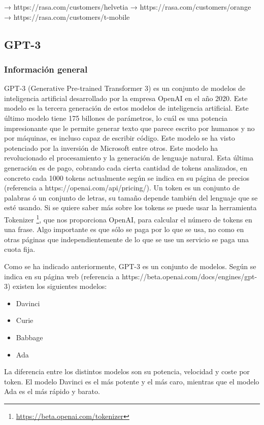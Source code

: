 → https://rasa.com/customers/helvetia
→ https://rasa.com/customers/orange
→ https://rasa.com/customers/t-mobile


\subsection{GPT-3}

\subsubsection*{Información general}

GPT-3 (Generative Pre-trained Transformer 3) es un conjunto de modelos de inteligencia artificial desarrollado por la empresa OpenAI en el año 2020. Este modelo es la tercera generación de estos modelos de inteligencia artificial. Este último modelo tiene 175 billones de parámetros, lo cuál es una potencia impresionante que le permite generar texto que parece escrito por humanos y no por máquinas, es incluso capaz de escribir código. Este modelo se ha visto potenciado por la inversión de Microsoft entre otros. Este modelo ha revolucionado el procesamiento y la generación de lenguaje natural. Esta última generación es de pago, cobrando cada cierta cantidad de tokens analizados, en concreto cada 1000 tokens actualmente según se indica en su página de precios (referencia a https://openai.com/api/pricing/). Un token es un conjunto de palabras ó un conjunto de letras, su tamaño depende también del lenguaje que se esté usando. Si se quiere saber más sobre los tokens se puede usar la herramienta Tokenizer \footnote{\url{https://beta.openai.com/tokenizer}}, que nos proporciona OpenAI, para calcular el número de tokens en una frase. Algo importante es que sólo se paga por lo que se usa, no como en otras páginas que independientemente de lo que se use un servicio se paga una cuota fija.

Como se ha indicado anteriormente, GPT-3 es un conjunto de modelos. Según se indica en su página web (referencia a https://beta.openai.com/docs/engines/gpt-3) existen los siguientes modelos:

\begin{itemize}
    \item Davinci
    \item Curie
    \item Babbage
    \item Ada
\end{itemize}

La diferencia entre los distintos modelos son su potencia, velocidad y coste por token. El modelo Davinci es el más potente y el más caro, mientras que el modelo Ada es el más rápido y barato.

